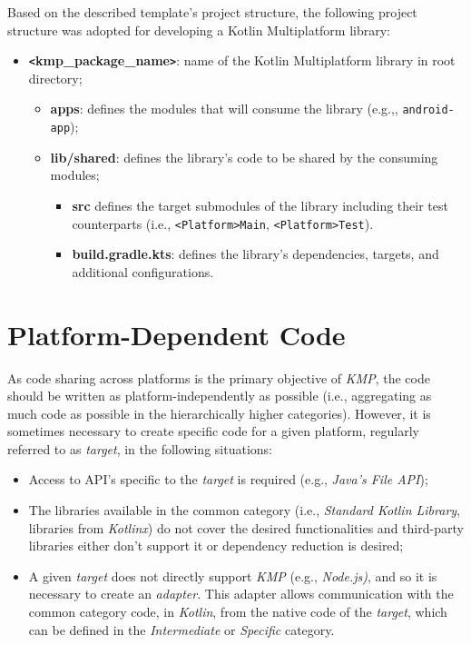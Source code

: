Based on the described template's project structure, the following project structure was adopted for developing a Kotlin Multiplatform library:

\begin{itemize}
    \item \textbf{\texttt{<}kmp\_package\_name\texttt{>}}: name of the Kotlin Multiplatform library in root directory;
    \begin{itemize}
        \item \textbf{apps}: defines the modules that will consume the \textitKMP library (e.g.,, \texttt{android-app});
        \item \textbf{lib/shared}: defines the library's code to be shared by the consuming modules;
        \begin{itemize}
            \item \textbf{src} defines the target submodules of the library including their test counterparts (i.e., \texttt{<Platform>Main}, \texttt{<Platform>Test}).
            \item \textbf{build.gradle.kts}: defines the library's dependencies, targets, and additional configurations.
        \end{itemize}
    \end{itemize}
\end{itemize}


\section{Platform-Dependent Code}\label{sec:platform-dependent-code}

As code sharing across platforms is the primary objective of \textit{KMP}, the code should be written as platform-independently as possible (i.e., aggregating as much code as possible in the hierarchically higher categories).
However, it is sometimes necessary to create specific code for a given platform, regularly referred to as \textit{target}, in the following situations:

\begin{itemize}
    \item Access to API's specific to the \textit{target} is required (e.g., \textit{Java's File API});
    \item The libraries available in the common category (i.e., \textit{Standard Kotlin Library}, libraries from \textit{Kotlinx}) do not cover the desired functionalities and third-party libraries either don't support it or dependency reduction is desired;
    \item A given \textit{target} does not directly support \textit{KMP} (e.g., \textit{Node.js)}, and so it is necessary to create an \textit{adapter}.
    This adapter allows communication with the common category code, in \textit{Kotlin}, from the native code of the \textit{target}, which can be defined in the \textit{Intermediate} or \textit{Specific} category.
\end{itemize}

